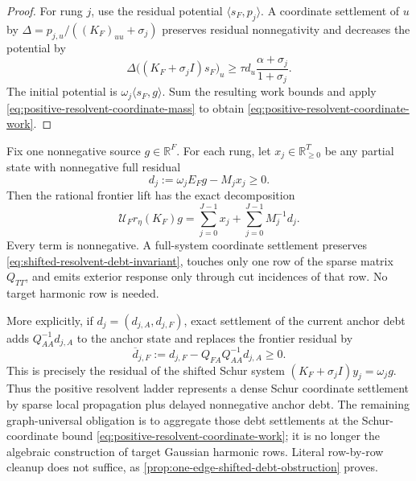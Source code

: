 \begin{proof}
For rung $j$, use the residual potential
$\langle s_F,p_j\rangle$.  A coordinate settlement of $u$ by
$\Delta=p_{j,u}/((K_F)_{uu}+\sigma_j)$ preserves residual nonnegativity and
decreases the potential by
\begin{equation*}
 \Delta\bigl((K_F+\sigma_jI)s_F\bigr)_u
 \geq
 \tau d_u\frac{\alpha+\sigma_j}{1+\sigma_j}.
\end{equation*}
The initial potential is
$\omega_j\langle s_F,g\rangle$.  Sum the resulting work bounds and apply
\cref{eq:positive-resolvent-coordinate-mass} to obtain
\cref{eq:positive-resolvent-coordinate-work}.
\end{proof}

\begin{corollary}
\label{cor:shifted-resolvent-anchor-debt}
Fix one nonnegative source $g\in\mathbb R^F$.  For each rung, let
$x_j\in\mathbb R_{\geq0}^T$ be any partial state with nonnegative full residual
\begin{equation}
 d_j:=\omega_jE_Fg-M_jx_j\geq0.
 \label{eq:shifted-resolvent-debt}
\end{equation}
Then the rational frontier lift has the exact decomposition
\begin{equation}
 \mathcal U_Fr_\eta(K_F)g
 =\sum_{j=0}^{J-1}x_j
  +\sum_{j=0}^{J-1}M_j^{-1}d_j.
 \label{eq:shifted-resolvent-debt-invariant}
\end{equation}
Every term is nonnegative.  A full-system coordinate settlement preserves
\cref{eq:shifted-resolvent-debt-invariant}, touches only one row of the sparse
matrix $Q_{TT}$, and emits exterior response only through cut incidences of
that row.  No target harmonic row is needed.

More explicitly, if $d_j=(d_{j,A},d_{j,F})$, exact settlement of the current
anchor debt adds $Q_{AA}^{-1}d_{j,A}$ to the anchor state and replaces the
frontier residual by
\begin{equation}
 \overline d_{j,F}
 :=d_{j,F}-Q_{FA}Q_{AA}^{-1}d_{j,A}\geq0.
 \label{eq:shifted-resolvent-schur-debt}
\end{equation}
This is precisely the residual of the shifted Schur system
$(K_F+\sigma_jI)y_j=\omega_jg$.  Thus the positive resolvent ladder represents
a dense Schur coordinate settlement by sparse local propagation plus delayed
nonnegative anchor debt.  The remaining graph-universal obligation is to
aggregate those debt settlements at the Schur-coordinate bound
\cref{eq:positive-resolvent-coordinate-work}; it is no longer the algebraic
construction of target Gaussian harmonic rows.  Literal row-by-row cleanup
does not suffice, as \cref{prop:one-edge-shifted-debt-obstruction} proves.
\end{corollary}

